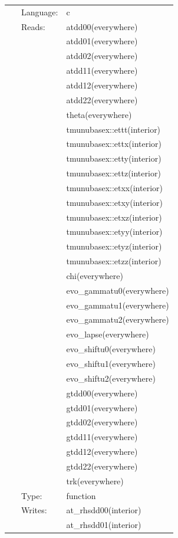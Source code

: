  \begin{tabular*}{160mm}{cll} 
~ & Language:  & c \\ 
~ & Reads:  & atdd00(everywhere) \\ 
~& ~ &atdd01(everywhere)\\ 
~& ~ &atdd02(everywhere)\\ 
~& ~ &atdd11(everywhere)\\ 
~& ~ &atdd12(everywhere)\\ 
~& ~ &atdd22(everywhere)\\ 
~& ~ &theta(everywhere)\\ 
~& ~ &tmunubasex::ettt(interior)\\ 
~& ~ &tmunubasex::ettx(interior)\\ 
~& ~ &tmunubasex::etty(interior)\\ 
~& ~ &tmunubasex::ettz(interior)\\ 
~& ~ &tmunubasex::etxx(interior)\\ 
~& ~ &tmunubasex::etxy(interior)\\ 
~& ~ &tmunubasex::etxz(interior)\\ 
~& ~ &tmunubasex::etyy(interior)\\ 
~& ~ &tmunubasex::etyz(interior)\\ 
~& ~ &tmunubasex::etzz(interior)\\ 
~& ~ &chi(everywhere)\\ 
~& ~ &evo\_gammatu0(everywhere)\\ 
~& ~ &evo\_gammatu1(everywhere)\\ 
~& ~ &evo\_gammatu2(everywhere)\\ 
~& ~ &evo\_lapse(everywhere)\\ 
~& ~ &evo\_shiftu0(everywhere)\\ 
~& ~ &evo\_shiftu1(everywhere)\\ 
~& ~ &evo\_shiftu2(everywhere)\\ 
~& ~ &gtdd00(everywhere)\\ 
~& ~ &gtdd01(everywhere)\\ 
~& ~ &gtdd02(everywhere)\\ 
~& ~ &gtdd11(everywhere)\\ 
~& ~ &gtdd12(everywhere)\\ 
~& ~ &gtdd22(everywhere)\\ 
~& ~ &trk(everywhere)\\ 
~ & Type:  & function \\ 
~ & Writes:  & at\_rhsdd00(interior) \\ 
~& ~ &at\_rhsdd01(interior)\\ 

\end{tabular*}
